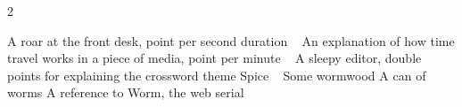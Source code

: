 \begin{multicols}{2}
\begin{small}
\begin{tabbing}
       {A roar at the front desk, point per second duration ~\M}
       {An explanation of how time travel works in a piece of media, point per minute ~\M}
       {A sleepy editor, double points for explaining the crossword theme}
       {Spice ~\E}
       {Some wormwood}
       {A can of worms}
       {A reference to Worm, the web serial}
      
      
      
        
    

\end{tabbing}
\end{small}
\end{multicols}
